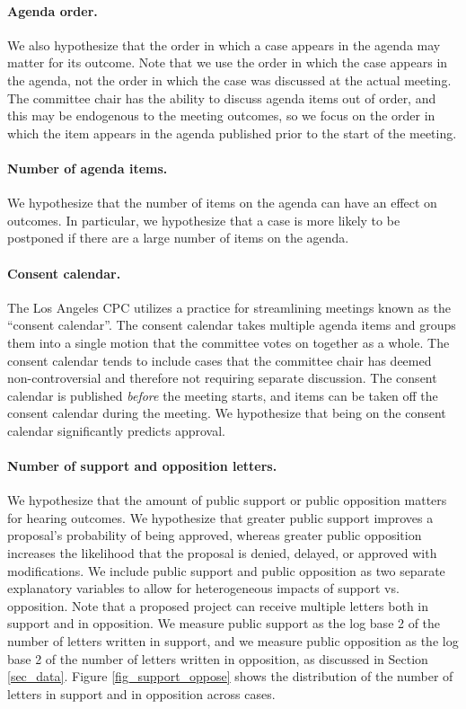 \paragraph{Agenda order.} We also hypothesize that the order in which a case appears in the agenda may matter for its outcome. Note that we use the order in which the case appears in the agenda, not the order in which the case was discussed at the actual meeting. The committee chair has the ability to discuss agenda items out of order, and this may be endogenous to the meeting outcomes, so we focus on the order in which the item appears in the agenda published prior to the start of the meeting.

\paragraph{Number of agenda items.} We hypothesize that the number of items on the agenda can have an effect on outcomes. In particular, we hypothesize that a case is more likely to be postponed if there are a large number of items on the agenda.

\paragraph{Consent calendar.} The Los Angeles CPC utilizes a practice for streamlining meetings known as the ``consent calendar''. The consent calendar takes multiple agenda items and groups them into a single motion that the committee votes on together as a whole. The consent calendar tends to include cases that the committee chair has deemed non-controversial and therefore not requiring separate discussion. The consent calendar is published \emph{before} the meeting starts, and items can be taken off the consent calendar during the meeting. We hypothesize that being on the consent calendar significantly predicts approval.

\paragraph{Number of support and opposition letters.} We hypothesize that the amount of public support or public opposition matters for hearing outcomes. We hypothesize that greater public support improves a proposal's probability of being approved, whereas greater public opposition increases the likelihood that the proposal is denied, delayed, or approved with modifications. We include public support and public opposition as two separate explanatory variables to allow for heterogeneous impacts of support vs. opposition. Note that a proposed project can receive multiple letters both in support and in opposition. We measure public support as the log base 2 of the number of letters written in support, and we measure public opposition as the log base 2 of the number of letters written in opposition, as discussed in Section \ref{sec_data}. Figure \ref{fig_support_oppose} shows the distribution of the number of letters in support and in opposition across cases. 


